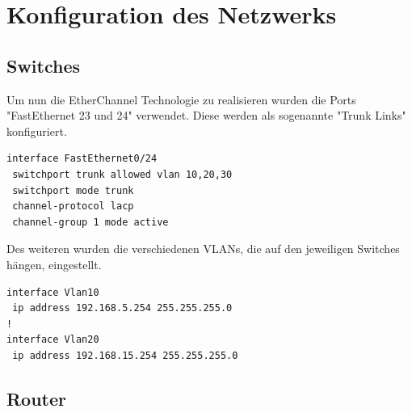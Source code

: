\chapter{Konfiguration des Netzwerks}

\section{Switches}

Um nun die EtherChannel Technologie zu realisieren wurden die Ports "FastEthernet 23 und 24" verwendet. Diese werden als sogenannte "Trunk Links" konfiguriert.

\begin{lstlisting}[caption={Setting EtherChannel on a switch},label={lst:etherchannel},language={}]
interface FastEthernet0/24
 switchport trunk allowed vlan 10,20,30
 switchport mode trunk
 channel-protocol lacp
 channel-group 1 mode active
\end{lstlisting}

Des weiteren wurden die verschiedenen \ac{VLAN}s, die auf den jeweiligen Switches hängen, eingestellt.

\begin{lstlisting}[caption={VLAN Konfiguration auf Switch 1},label={lst:etherchannel},language={}]
interface Vlan10
 ip address 192.168.5.254 255.255.255.0
!
interface Vlan20
 ip address 192.168.15.254 255.255.255.0

\end{lstlisting}

\section{Router}

